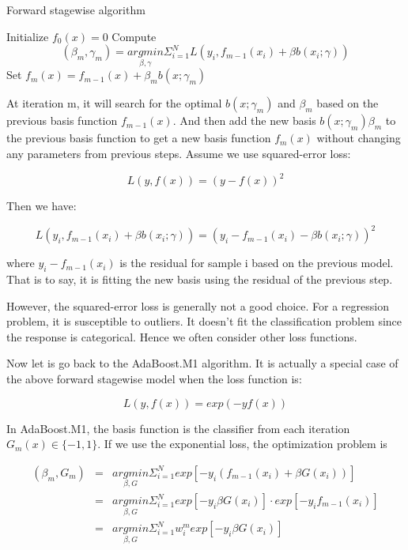 \documentclass[12pt,]{krantz}
\begin{document}
\begin{algorithm}
\caption{Forward stagewise algorithm}\label{forwardstagewisealgorithm} 
\begin{algorithmic}[1] 
\State Initialize $f_0(x)=0$
    \State Compute
    $$(\beta_m,\gamma_m)=\underset{\beta,\gamma}{argmin}\Sigma_{i=1}^NL(y_i,f_{m-1}(x_i)+\beta b(x_i;\gamma))$$
    \State Set $f_m(x)=f_{m-1}(x)+\beta_m b(x;\gamma_m)$
\EndFor
\end{algorithmic}
\end{algorithm}

At iteration m, it will search for the optimal \(b(x;\gamma_m)\) and \(\beta_m\) based on the previous basis function \(f_{m-1}(x)\). And then add the new basis \(b(x;\gamma_m)\beta_m\) to the previous basis function to get a new basis function \(f_m(x)\) without changing any parameters from previous steps. Assume we use squared-error loss:

\[L(y,f(x))=(y-f(x))^2\]

Then we have:

\[L(y_i,f_{m-1}(x_i)+\beta b(x_i;\gamma))=(y_i-f_{m-1}(x_i)-\beta b(x_i;\gamma))^2\]

where \(y_i-f_{m-1}(x_i)\) is the residual for sample i based on the previous model. That is to say, it is fitting the new basis using the residual of the previous step.

However, the squared-error loss is generally not a good choice. For a regression problem, it is susceptible to outliers. It doesn't fit the classification problem since the response is categorical. Hence we often consider other loss functions.

Now let is go back to the AdaBoost.M1 algorithm. It is actually a special case of the above forward stagewise model when the loss function is:

\[L(y,f(x))=exp(-yf(x))\]

In AdaBoost.M1, the basis function is the classifier from each iteration \(G_m(x)\in \{-1,1\}\). If we use the exponential loss, the optimization problem is

\begin{equation}
\begin{array}{ccc}
(\beta_m,G_m) & = & \underset{\beta,G}{argmin}\Sigma_{i=1}^N exp[-y_i(f_{m-1}(x_i)+\beta G(x_i))]\\
& = & \underset{\beta, G}{argmin}\Sigma_{i=1}^N exp[-y_i \beta G(x_i)]\cdot exp[-y_if_{m-1}(x_i)]\\
& = & \underset{\beta, G}{argmin}\Sigma_{i=1}^N w_i^m exp[-y_i\beta G(x_i)]
\end{array}
\label{eq:explossadaboost1}
\end{equation}
\end{document}
